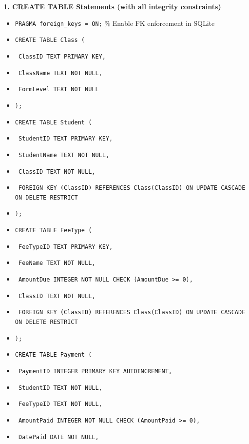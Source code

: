 \documentclass[11pt]{article}
\begin{document}
\begin{exoresolu}
\textbf{1. CREATE TABLE Statements (with all integrity constraints)}\par
\begin{methode}
\begin{itemize}
    \item \texttt{PRAGMA foreign\_keys = ON;} \quad\% Enable FK enforcement in SQLite
    \item \texttt{CREATE TABLE Class (}
    \item \texttt{    ClassID TEXT PRIMARY KEY,}
    \item \texttt{    ClassName TEXT NOT NULL,}
    \item \texttt{    FormLevel TEXT NOT NULL}
    \item \texttt{);}
    \item \texttt{CREATE TABLE Student (}
    \item \texttt{    StudentID TEXT PRIMARY KEY,}
    \item \texttt{    StudentName TEXT NOT NULL,}
    \item \texttt{    ClassID TEXT NOT NULL,}
    \item \texttt{    FOREIGN KEY (ClassID) REFERENCES Class(ClassID) ON UPDATE CASCADE ON DELETE RESTRICT}
    \item \texttt{);}
    \item \texttt{CREATE TABLE FeeType (}
    \item \texttt{    FeeTypeID TEXT PRIMARY KEY,}
    \item \texttt{    FeeName TEXT NOT NULL,}
    \item \texttt{    AmountDue INTEGER NOT NULL CHECK (AmountDue >= 0),}
    \item \texttt{    ClassID TEXT NOT NULL,}
    \item \texttt{    FOREIGN KEY (ClassID) REFERENCES Class(ClassID) ON UPDATE CASCADE ON DELETE RESTRICT}
    \item \texttt{);}
    \item \texttt{CREATE TABLE Payment (}
    \item \texttt{    PaymentID INTEGER PRIMARY KEY AUTOINCREMENT,}
    \item \texttt{    StudentID TEXT NOT NULL,}
    \item \texttt{    FeeTypeID TEXT NOT NULL,}
    \item \texttt{    AmountPaid INTEGER NOT NULL CHECK (AmountPaid >= 0),}
    \item \texttt{    DatePaid DATE NOT NULL,}

\end{itemize}
\end{methode}
\end{exoresolu}
\end{document}
